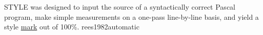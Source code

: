 \documentclass{article}
\begin{document}
  {STYLE was designed to input the source of a syntactically correct Pascal program, make simple measurements on a one-pass line-by-line basis, and yield a style \ul{mark} out of 100\%.}
  {rees1982automatic}
\end{document}
